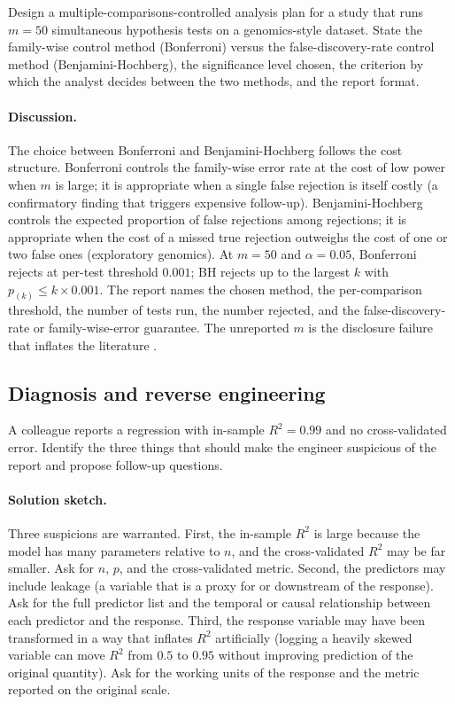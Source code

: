 \begin{exercise}
Design a multiple-comparisons-controlled analysis plan for a
study that runs $m = 50$ simultaneous hypothesis tests on a
genomics-style dataset. State the family-wise control method
(Bonferroni) versus the false-discovery-rate control method
(Benjamini-Hochberg), the significance level chosen, the criterion
by which the analyst decides between the two methods, and the
report format.

\paragraph{Discussion.} The choice between Bonferroni and
Benjamini-Hochberg follows the cost structure. Bonferroni
controls the family-wise error rate at the cost of low power
when $m$ is large; it is appropriate when a single false rejection
is itself costly (a confirmatory finding that triggers expensive
follow-up). Benjamini-Hochberg controls the expected proportion
of false rejections among rejections; it is appropriate when
the cost of a missed true rejection outweighs the cost of one
or two false ones (exploratory genomics). At $m = 50$ and
$\alpha = 0.05$, Bonferroni rejects at per-test threshold
$0.001$; BH rejects up to the largest $k$ with $p_{(k)} \leq k
\times 0.001$. The report names the chosen method, the
per-comparison threshold, the number of tests run, the number
rejected, and the false-discovery-rate or family-wise-error
guarantee. The unreported $m$ is the disclosure failure that
inflates the literature
\cite{method:simmons-nelson-simonsohn-2011}.
\end{exercise}

\subsection*{Diagnosis and reverse engineering}

\begin{exercise}
A colleague reports a regression with in-sample $R^{2} = 0.99$ and
no cross-validated error. Identify the three things that should
make the engineer suspicious of the report and propose follow-up
questions.

\paragraph{Solution sketch.} Three suspicions are warranted.
First, the in-sample $R^{2}$ is large because the model has many
parameters relative to $n$, and the cross-validated $R^{2}$ may
be far smaller. Ask for $n$, $p$, and the cross-validated
metric. Second, the predictors may include leakage (a variable
that is a proxy for or downstream of the response). Ask for the
full predictor list and the temporal or causal relationship
between each predictor and the response. Third, the response
variable may have been transformed in a way that inflates
$R^{2}$ artificially (logging a heavily skewed variable can
move $R^{2}$ from $0.5$ to $0.95$ without improving prediction
of the original quantity). Ask for the working units of the
response and the metric reported on the original scale.
\end{exercise}

